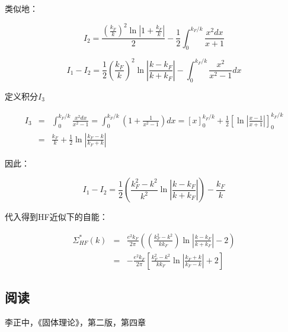 类似地：

\begin{equation*}
I_2 = \frac{  \left( \frac{k_F}{k} \right)^2 \ln \left| 1 + \frac{ k_F }{ k } \right| }{2} - \frac{1}{2} \int_0^{k_F / k} \frac{x^2 d x}{x + 1}
\end{equation*}

\begin{equation*}
I_1 - I_2 = \frac{1}{2} \left( \frac{k_F}{k} \right)^2 \ln  \left|  \frac{ k - k_F }{ k + k_F }  \right| - \int_0^{k_F / k} \frac{x^2 }{x^2 - 1} dx
\end{equation*}

定义积分$I_3$

\begin{eqnarray*}
I_3 & = & \int_0^{k_F / k} \frac{x^2 dx}{x^2 -1} = \int_0^{k_F / k} \left( 1 + \frac{1}{x^2 - 1} \right) dx  = [x]_0^{ k_F / k  } + \frac{1}{2} \left[  \ln \left|  \frac{x-1}{x+1}   \right|  \right]_0^{k_F / k} \\
{} & = & \frac{k_F}{k } + \frac{1}{2} \ln \left| \frac{k_F - k}{k_F + k}  \right|
\end{eqnarray*}

因此：

\begin{equation*}
I_1 - I_2 = \frac{1}{2} \left(  \frac{k_F^2 - k^2}{ k^2 } \ln \left| \frac{ k-k_F }{k + k_F}  \right| \right) - \frac{k_F}{k}
\end{equation*}

代入得到HF近似下的自能：

\begin{eqnarray*}
\Sigma^*_{HF} (k) & =& \frac{e^2 k_F }{ 2 \pi } \left(  \left( \frac{k_F^2 - k^2}{ k k_F}  \right)  \ln \left| \frac{ k - k_F}{ k + k_F  } \right| - 2  \right) \\
{} & = & - \frac{e^2 k_F}{ 2 \pi } \left[ \frac{k_F^2 - k^2}{ k k_F } \ln \left| \frac{k_F + k}{ k_F - k }  \right|  + 2  \right] 
\end{eqnarray*}

\subsection*{阅读}

李正中，《固体理论》，第二版，第四章

